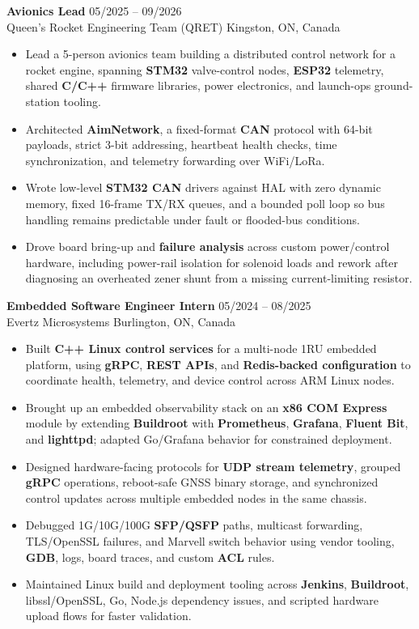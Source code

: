 \documentclass[letterpaper,10pt]{article}
\begin{document}
    \noindent \textbf{Avionics Lead} \hfill 05/2025 -- 09/2026 \\
    Queen's Rocket Engineering Team (QRET) \hfill Kingston, ON, Canada
    \begin{itemize}
        \item Lead a 5-person avionics team building a distributed control network for a rocket engine, spanning \textbf{STM32} valve-control nodes, \textbf{ESP32} telemetry, shared \textbf{C/C++} firmware libraries, power electronics, and launch-ops ground-station tooling.
        \item Architected \textbf{AimNetwork}, a fixed-format \textbf{CAN} protocol with 64-bit payloads, strict 3-bit addressing, heartbeat health checks, time synchronization, and telemetry forwarding over WiFi/LoRa.
        \item Wrote low-level \textbf{STM32 CAN} drivers against HAL with zero dynamic memory, fixed 16-frame TX/RX queues, and a bounded poll loop so bus handling remains predictable under fault or flooded-bus conditions.
        \item Drove board bring-up and \textbf{failure analysis} across custom power/control hardware, including power-rail isolation for solenoid loads and rework after diagnosing an overheated zener shunt from a missing current-limiting resistor.
    \end{itemize}
    
    \noindent \textbf{Embedded Software Engineer Intern} \hfill 05/2024 -- 08/2025 \\
    Evertz Microsystems \hfill Burlington, ON, Canada
    \begin{itemize}
        \item Built \textbf{C++ Linux control services} for a multi-node 1RU embedded platform, using \textbf{gRPC}, \textbf{REST APIs}, and \textbf{Redis-backed configuration} to coordinate health, telemetry, and device control across ARM Linux nodes.
        \item Brought up an embedded observability stack on an \textbf{x86 COM Express} module by extending \textbf{Buildroot} with \textbf{Prometheus}, \textbf{Grafana}, \textbf{Fluent Bit}, and \textbf{lighttpd}; adapted Go/Grafana behavior for constrained deployment.
        \item Designed hardware-facing protocols for \textbf{UDP stream telemetry}, grouped \textbf{gRPC} operations, reboot-safe GNSS binary storage, and synchronized control updates across multiple embedded nodes in the same chassis.
        \item Debugged 1G/10G/100G \textbf{SFP/QSFP} paths, multicast forwarding, TLS/OpenSSL failures, and Marvell switch behavior using vendor tooling, \textbf{GDB}, logs, board traces, and custom \textbf{ACL} rules.
        \item Maintained Linux build and deployment tooling across \textbf{Jenkins}, \textbf{Buildroot}, libssl/OpenSSL, Go, Node.js dependency issues, and scripted hardware upload flows for faster validation.
    \end{itemize}
\end{document}
